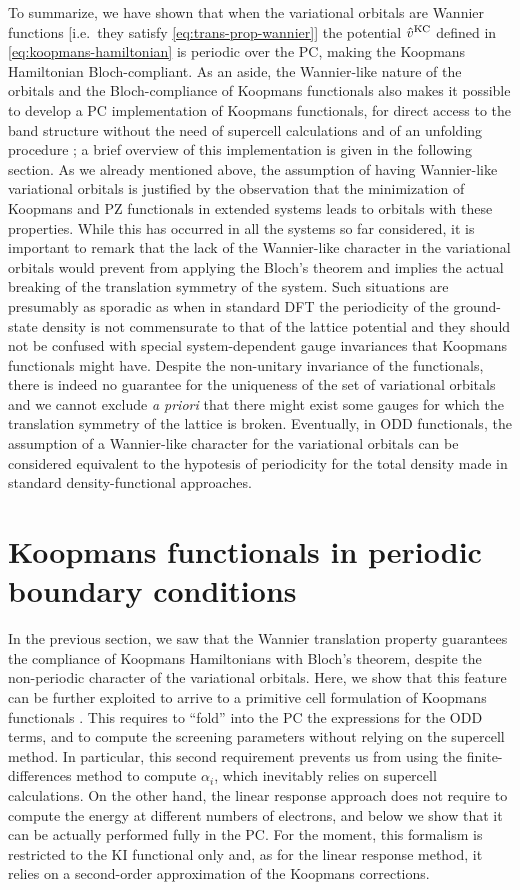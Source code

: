 To summarize, we have shown that when the variational orbitals are Wannier functions [i.e.\ they satisfy \cref{eq:trans-prop-wannier}] the potential $\hat{v}^{\rm KC}$ defined in \cref{eq:koopmans-hamiltonian} is periodic over the PC, making the Koopmans Hamiltonian Bloch-compliant. As an aside, the Wannier-like nature of the orbitals and the Bloch-compliance of Koopmans functionals also makes it possible to develop a PC implementation of Koopmans functionals, for direct access to the band structure without the need of supercell calculations and of an unfolding procedure \cite{colonna_koopmans_2022}; a brief overview of this implementation is given in the following section. As we already mentioned above, the assumption of having Wannier-like variational orbitals is justified by the observation that the minimization of Koopmans and PZ functionals in extended systems leads to orbitals with these properties. While this has occurred in all the systems so far considered, it is important to remark that the lack of the Wannier-like character in the variational orbitals would prevent from applying the Bloch's theorem and implies the actual breaking of the translation symmetry of the system. Such situations are presumably as sporadic as when in standard DFT the periodicity of the ground-state density is not commensurate to that of the lattice potential and they should not be confused with special system-dependent gauge invariances that Koopmans functionals might have. Despite the non-unitary invariance of the functionals, there is indeed no guarantee for the uniqueness of the set of variational orbitals and we cannot exclude \emph{a priori} that there might exist some gauges for which the translation symmetry of the lattice is broken. Eventually, in ODD functionals, the assumption of a Wannier-like character for the variational orbitals can be considered equivalent to the hypotesis of periodicity for the total density made in standard density-functional approaches.

\section{Koopmans functionals in periodic boundary conditions\label{sec:koopmans-pbc}}
In the previous section, we saw that the Wannier translation property guarantees the compliance of Koopmans Hamiltonians with Bloch's theorem, despite the non-periodic character of the variational orbitals. Here, we show that this feature can be further exploited to arrive to a primitive cell formulation of Koopmans functionals \cite{colonna_koopmans_2022}. This requires to ``fold'' into the PC the expressions for the ODD terms, and to compute the screening parameters without relying on the supercell method. In particular, this second requirement prevents us from using the finite-differences method to compute $\alpha_i$, which inevitably relies on supercell calculations. On the other hand, the linear response approach does not require to compute the energy at different numbers of electrons, and below we show that it can be actually performed fully in the PC. For the moment, this formalism is restricted to the KI functional only and, as for the linear response method, it relies on a second-order approximation of the Koopmans corrections.


